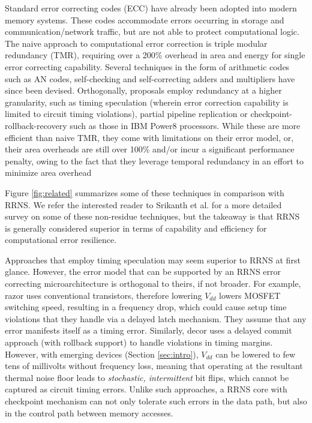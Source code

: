 \documentclass{sig-alternate}
\begin{document}
Standard error correcting codes (ECC)\cite{macwilliams1977theory} have already been adopted into modern memory systems. These codes accommodate errors occurring in storage and communication/network traffic, but are not able to protect computational logic. The naive approach to computational error correction is triple modular redundancy (TMR)\cite{von1956probabilistic}, requiring over a 200\% overhead in area and energy for single error correcting capability. Several techniques in the form of arithmetic codes such as AN codes\cite{brown1960error,fetzer2009encoding,forin1989vital,liu1972error,schiffel2010anb,wappler2007hardware}, self-checking\cite{johnson1988efficient,keren2008arbitrary,marienfeld2005new,nicolaidis2003carry,nicolaidis1998design,nicolaidis1994efficient,vasudevan2005technique} and self-correcting\cite{sun2010cost,hsu1992time,peng2005fault,dolev2013preserving,ghosh2008novel,krekhov2008method,mathew2010multiple,rao2008towards,rao2006fault,valinataj2007fault} adders and multipliers have since been devised. Orthogonally, proposals employ redundancy at a higher granularity, such as timing speculation (wherein error correction capability is limited to circuit timing violations)\cite{razor_2003,decor_2008}, partial pipeline replication\cite{DIVA} or checkpoint-rollback-recovery such as those in IBM Power8 processors\cite{ibmpower8}. While these are more efficient than naive TMR, they come with limitations on their error model, or, their area overheads are still over 100\% and/or incur a significant performance penalty, owing to the fact that they leverage temporal redundancy in an effort to minimize area overhead\cite{srikanth2016brief}

Figure \ref{fig:related} summarizes some of these techniques in comparison with RRNS. We refer the interested reader to Srikanth et al.\cite{srikanth2016brief} for a more detailed survey on some of these non-residue techniques, but the takeaway is that RRNS is generally considered superior in terms of capability and efficiency for computational error resilience. 

Approaches that employ timing speculation\cite{razor_2003,decor_2008} may seem superior to RRNS at first glance. However, the error model that can be supported by an RRNS error correcting microarchitecture is orthogonal to theirs, if not broader. For example, razor\cite{razor_2003} uses conventional transistors, therefore lowering $V_{dd}$ lowers MOSFET switching speed, resulting in a frequency drop, which could cause setup time violations that they handle via a delayed latch mechanism. They assume that any error manifests itself as a timing error. Similarly, decor\cite{decor_2008} uses a delayed commit approach (with rollback support) to handle violations in timing margins. However, with emerging devices (Section \ref{sec:intro}), $V_{dd}$ can be lowered to few tens of millivolts without frequency loss, meaning that operating at the resultant thermal noise floor leads to \textit{stochastic, intermittent} bit flips, which cannot be captured as circuit timing errors. Unlike such approaches, a RRNS core with checkpoint mechanism can not only tolerate such errors in the data path, but also in the control path between memory accesses.
\end{document}
